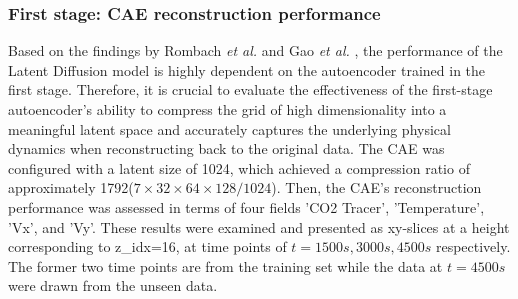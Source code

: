\documentclass[final-report]{article-template}
\begin{document}
\subsubsection{First stage: CAE reconstruction performance}
Based on the findings by Rombach \textit{et al.} \cite{rombach2022highresolution} and Gao \textit{et al.} \cite{gao2024prediff}, the performance of the Latent Diffusion model is highly dependent on the autoencoder trained in the first stage. Therefore, it is crucial to evaluate the effectiveness of the first-stage autoencoder's ability to compress the grid of high dimensionality into a meaningful latent space and accurately captures the underlying physical dynamics when reconstructing back to the original data. The CAE was configured with a latent size of 1024, which achieved a compression ratio of approximately 1792($7 \times 32 \times 64 \times 128 / 1024$). Then, the CAE's reconstruction performance was assessed in terms of four fields 'CO2 Tracer', 'Temperature', 'Vx', and 'Vy'. These results were examined and presented as xy-slices at a height corresponding to z\_idx=16, at time points of $t = 1500s, 3000s, 4500s$ respectively. The former two time points are from the training set while the data at $t = 4500s$ were drawn from the unseen data.\\
\end{document}
